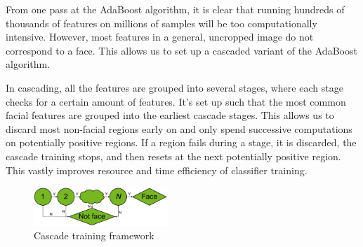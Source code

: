 \documentclass[journal]{IEEEtran}
\begin{document}
\par From one pass at the AdaBoost algorithm, it is clear that running hundreds of thousands of features on millions of samples will be too computationally intensive. However, most features in a general, uncropped image do not correspond to a face. This allows us to set up a cascaded variant of the AdaBoost algorithm.
\par In cascading, all the features are grouped into several stages, where each stage checks for a certain amount of features. It's set up such that the most common facial features are grouped into the earliest cascade stages. This allows us to discard most non-facial regions early on and only spend successive computations on potentially positive regions. If a region fails during a stage, it is discarded, the cascade training stops, and then resets at the next potentially positive region. This vastly improves resource and time efficiency of classifier training.
\begin{figure}[h]
	\centering
	\includegraphics[width=0.45\textwidth]{cascade_framework.png}
	\caption{Cascade training framework}
    \label{cascade-framework}
\end{figure}
\end{document}
